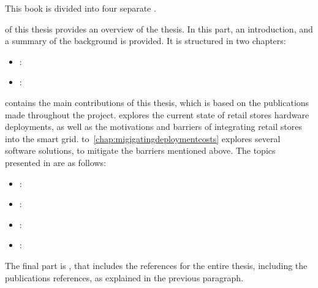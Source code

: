 

This book is divided into four separate .

 of this \phd thesis provides an overview of the thesis.
In this part, an introduction, and a summary of the background is provided.
It is structured in two chapters:
\begin{itemize}
    \item {}: 
    \item {}: 
\end{itemize}

 contains the main contributions of this thesis, which is based on the publications made throughout the \phd project.
 explores the current state of retail stores hardware deployments, as well as the motivations and barriers of integrating retail stores into the smart grid.
 to~\ref{chap:migigatingdeploymentcosts} explores several software solutions, to mitigate the barriers mentioned above.
The topics presented in  are as follows:
\begin{itemize}
    \item {}: 
    \item {}: 
    \item {}: 
    \item {}: 
\end{itemize}


The final part is , that includes the references for the entire \phd thesis, including the publications references, as explained in the previous paragraph.